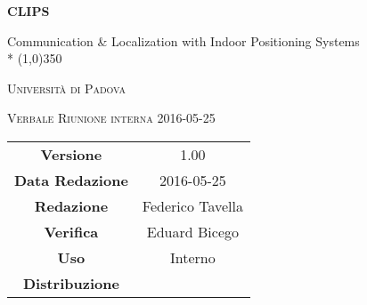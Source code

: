\documentclass[a4paper,12pt]{article}
\author{Federico Tavella}
\date{25/05/2016}
\begin{document}
\begin{titlepage}
	\centering
	{\huge\bfseries CLIPS\par}
	Communication \& Localization with Indoor Positioning Systems \\*
	\line(1,0){350} \\
	{\scshape\LARGE Università di Padova \par}
	\vspace{1cm}
	{\scshape\Large Verbale Riunione interna 2016-05-25 \par}
	\logo
	\newpage
	\begin{tabular}{c|c}
		{\hfill \textbf{Versione}} 			& 1.00				\\
		{\hfill\textbf{Data Redazione}} 	& 2016-05-25  		\\
		{\hfill\textbf{Redazione}} 			& Federico Tavella	\\
		{\hfill\textbf{Verifica}} 			& Eduard Bicego		\\
		{\hfill\textbf{Uso}} 				& Interno			\\
		{\hfill\textbf{Distribuzione}} 		& \leaf\			\\
	\end{tabular}
\end{titlepage}
	
	\newpage

	
	\label{LastFrontPage}
	

	\newpage
	
	\pagestyle{mymain}
	
	
		

	
		
	
		
	
		\newpage
		
				
	\label{LastPage}
\end{document}
